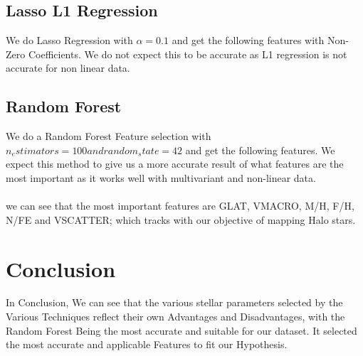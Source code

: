 \documentclass{article}
\begin{document}
\subsection{Lasso L1 Regression}
We do Lasso Regression with \(\alpha=0.1\) and get the following features with Non-Zero Coefficients. We do not expect this to be accurate as L1 regression is not accurate for non linear data.
\paragraph{}


\subsection{Random Forest}
We do a Random Forest Feature selection with \(n_estimators=100 and random_state=42\) and get the following features. We expect this method to give us a more accurate result of what features are the most important as it works well with multivariant and non-linear data.
\paragraph{}
we can see that the most important features are GLAT, VMACRO, M/H, F/H, N/FE and VSCATTER; which tracks with our objective of mapping Halo stars.
\paragraph{}

\section{Conclusion}
In Conclusion, We can see that the various stellar parameters selected by the Various Techniques reflect their own Advantages and Disadvantages, with the Random Forest Being the most accurate and suitable for our dataset. It selected the most accurate and applicable Features to fit our Hypothesis.
\end{document}
